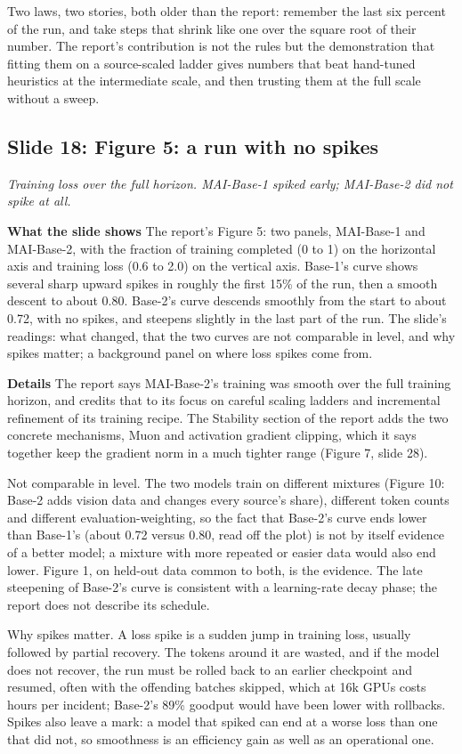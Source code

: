 \documentclass[11pt,letterpaper]{article}
\newcommand{\slide}[3]{%
  \subsection[Slide #1: #2]{Slide #1: #2}%
  {\color{muted}\itshape #3\par}\medskip}
\newcommand{\para}[1]{\medskip\noindent\textbf{#1}\quad}
\newenvironment{intuition}{\begin{tcolorbox}[intuitionbox]}{\end{tcolorbox}}
\begin{document}
\begin{intuition}
Two laws, two stories, both older than the report: remember the last six percent of the run, and take steps that shrink like one over the square root of their number. The report's contribution is not the rules but the demonstration that fitting them on a source-scaled ladder gives numbers that beat hand-tuned heuristics at the intermediate scale, and then trusting them at the full scale without a sweep.
\end{intuition}

\slide{18}{Figure 5: a run with no spikes}{Training loss over the full horizon. MAI-Base-1 spiked early; MAI-Base-2 did not spike at all.}

\para{What the slide shows} The report's Figure 5: two panels, MAI-Base-1 and MAI-Base-2, with the fraction of training completed (0 to 1) on the horizontal axis and training loss (0.6 to 2.0) on the vertical axis. Base-1's curve shows several sharp upward spikes in roughly the first 15\% of the run, then a smooth descent to about 0.80. Base-2's curve descends smoothly from the start to about 0.72, with no spikes, and steepens slightly in the last part of the run. The slide's readings: what changed, that the two curves are not comparable in level, and why spikes matter; a background panel on where loss spikes come from.

\para{Details} The report says MAI-Base-2's training was smooth over the full training horizon, and credits that to its focus on careful scaling ladders and incremental refinement of its training recipe. The Stability section of the report adds the two concrete mechanisms, Muon and activation gradient clipping, which it says together keep the gradient norm in a much tighter range (Figure 7, slide 28).

Not comparable in level. The two models train on different mixtures (Figure 10: Base-2 adds vision data and changes every source's share), different token counts and different evaluation-weighting, so the fact that Base-2's curve ends lower than Base-1's (about 0.72 versus 0.80, read off the plot) is not by itself evidence of a better model; a mixture with more repeated or easier data would also end lower. Figure 1, on held-out data common to both, is the evidence. The late steepening of Base-2's curve is consistent with a learning-rate decay phase; the report does not describe its schedule.

Why spikes matter. A loss spike is a sudden jump in training loss, usually followed by partial recovery. The tokens around it are wasted, and if the model does not recover, the run must be rolled back to an earlier checkpoint and resumed, often with the offending batches skipped, which at 16k GPUs costs hours per incident; Base-2's 89\% goodput would have been lower with rollbacks. Spikes also leave a mark: a model that spiked can end at a worse loss than one that did not, so smoothness is an efficiency gain as well as an operational one.
\end{document}
